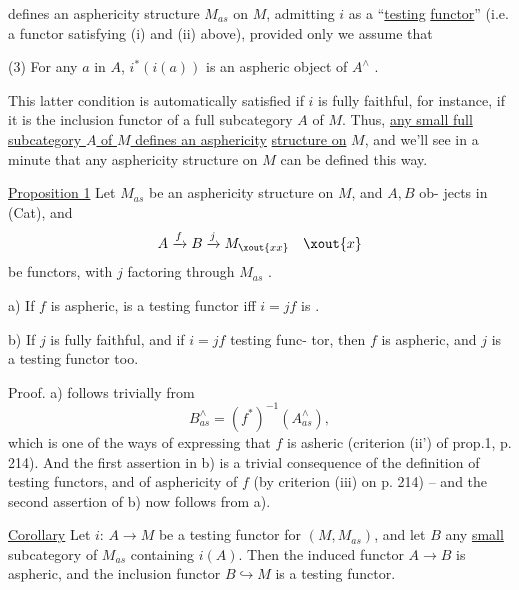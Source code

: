 
defines an asphericity structure  $M_{as}$ on $M$, admitting $i$ as a ``\uline{testing}%
\uline{functor}'' (i.e. a functor satisfying (i) and (ii) above), provided only
we assume that

(3) For any $a$ in $A$, $i^{*}(i(a))$ is an aspheric object of $A^{\wedge}$ .

This latter condition is automatically satisfied if $i$ is fully faithful,
for instance, if it is the inclusion functor of a full subcategory $A$
of $M$. Thus, \uline{any small full subcategory $A$ of $M$ defines an asphericity}
\uline{structure on} $M$, and we'll see in a minute that any asphericity structure
on $M$ can be defined this way.

\uline{Proposition 1} Let $M_{as}$ be an asphericity structure on $M$, and $A,B$ ob-%
jects in (Cat), and
\[ A \xrightarrow{f} B \xrightarrow{j} M_{\xout{xx}} \quad \xout{x} \]
be functors, with $j$ factoring through $M_{as}$ .

a) If $f$ is aspheric,  is a testing functor iff $i=jf$ is .

b) If $j$ is fully faithful, and if  $i=jf$  testing func-%
tor, then $f$ is aspheric, and $j$ is a testing functor too.

Proof. a) follows trivially from
\[ B^{\wedge}_{as} = (f^{*})^{-1}(A^{\wedge}_{as}) , \]
which is one of the ways of expressing that $f$ is asheric\xout{\unsure{,}} (criterion
(ii') of prop.1, p. 214). And the first assertion in b) is a trivial
consequence of the definition of testing functors, and of asphericity
of $f$ (by criterion (iii) on p. 214) -- and the second assertion of b)
now follows from a).

\uline{Corollary} Let $i$: $A\longrightarrow M$ be a testing functor for $(M,M_{as})$, and let
$B$ any \uline{small}  subcategory of $M_{as}$ containing $i(A)$. Then the induced functor
$A\longrightarrow B$ is aspheric, and the inclusion functor $B\hookrightarrow M$ is a testing functor.

